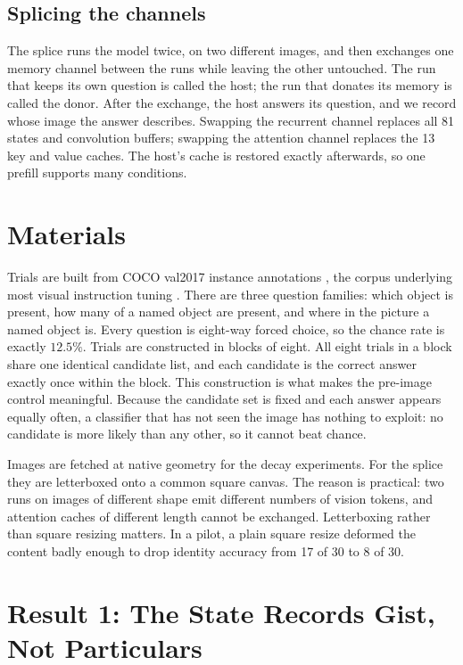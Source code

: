 \documentclass[10pt]{article}
\begin{document}
\subsection{Splicing the channels}

The splice runs the model twice, on two different images, and then exchanges
one memory channel between the runs while leaving the other untouched. The run
that keeps its own question is called the host; the run that donates its
memory is called the donor. After the exchange, the host answers its question,
and we record whose image the answer describes. Swapping the recurrent channel
replaces all 81 states and convolution buffers; swapping the attention channel
replaces the 13 key and value caches. The host's cache is restored exactly
afterwards, so one prefill supports many conditions.

\section{Materials}

Trials are built from COCO val2017 instance annotations \cite{lin2014coco},
the corpus underlying most visual instruction tuning \cite{liu2023llava}.
There are three question families: which object is present, how many of a
named object are present, and where in the picture a named object is. Every
question is eight-way forced choice, so the chance rate is exactly $12.5\%$.
Trials are constructed in blocks of eight. All eight trials in a block share
one identical candidate list, and each candidate is the correct answer exactly
once within the block. This construction is what makes the pre-image control
meaningful. Because the candidate set is fixed and each answer appears equally
often, a classifier that has not seen the image has nothing to exploit: no
candidate is more likely than any other, so it cannot beat chance.

Images are fetched at native geometry for the decay experiments. For the
splice they are letterboxed onto a common square canvas. The reason is
practical: two runs on images of different shape emit different numbers of
vision tokens, and attention caches of different length cannot be exchanged.
Letterboxing rather than square resizing matters. In a pilot, a plain square
resize deformed the content badly enough to drop identity accuracy from 17 of
30 to 8 of 30.

\section{Result 1: The State Records Gist, Not Particulars}
\end{document}
